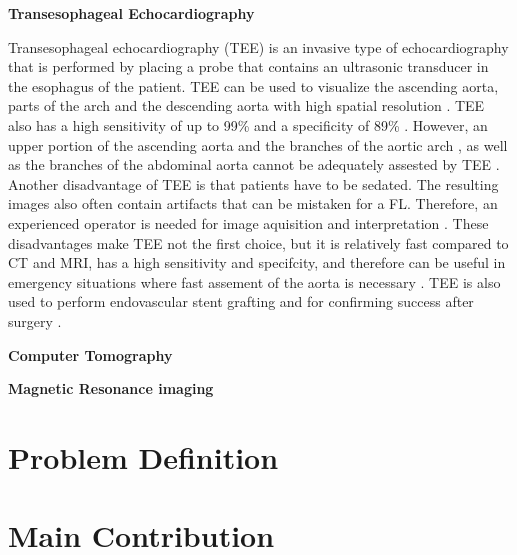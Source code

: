 \documentclass[thesis.tex]{subfiles}
\begin{document}
\textbf{Transesophageal Echocardiography}

Transesophageal echocardiography (TEE) is an invasive type of echocardiography that is performed by placing a probe that contains an ultrasonic transducer in the esophagus of the patient. TEE can be used to visualize the ascending aorta, parts of the arch and the descending aorta with high spatial resolution \cite{baliga2014role}. TEE also has a high sensitivity of up to 99\% and a specificity of 89\% \cite{baliga2014role}. However, an upper portion of the ascending aorta and the branches of the aortic arch \cite{shiga2006diagnostic,baliga2014role}, as well as the branches of the abdominal aorta cannot be adequately assested by TEE \cite{baliga2014role}. Another disadvantage of TEE is that patients have to be sedated. The resulting images also often contain artifacts that can be mistaken for a FL. Therefore, an experienced operator is needed for image aquisition and interpretation \cite{shiga2006diagnostic,baliga2014role}. These disadvantages make TEE not the first choice, but it is relatively fast compared to CT and MRI, has a high sensitivity and specifcity, and therefore can be useful in emergency situations where fast assement of the aorta is necessary \cite{shiga2006diagnostic,baliga2014role}. TEE is also used to perform endovascular stent grafting and for confirming success after surgery \cite{baliga2014role}. 

\textbf{Computer Tomography} 

\textbf{Magnetic Resonance imaging}

\section{Problem Definition}

\section{Main Contribution}


\subfilebib %
\end{document}
